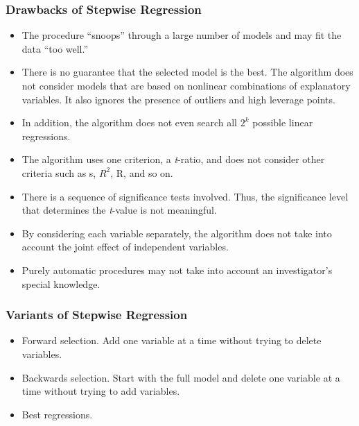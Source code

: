 \begin{frame}%
 \frametitle{Drawbacks of Stepwise Regression}
 \begin{itemize}

\item The procedure ``snoops'' through a large number of models and may
fit the data ``too well.''

\item There is no guarantee that the selected model is the best. The algorithm
does not consider models that are based on nonlinear combinations of
explanatory variables. It also ignores the presence of outliers and
high leverage points.

  \item In addition, the algorithm does not even search all $2^{k}$ possible
linear regressions.

  \item The algorithm uses one criterion, a \textit{t}-ratio, and does not
consider other criteria such as s, $R^{2}$, R, and so on.

  \item There is a sequence of significance tests involved. Thus, the
significance level that determines the \textit{t}-value is not
meaningful.

  \item By considering each variable separately, the algorithm does not take into
account the joint effect of independent variables.

  \item Purely automatic procedures may not take into account an investigator's
special knowledge.

    \end{itemize}
\end{frame}

\begin{frame}%
 \frametitle{Variants of Stepwise Regression }
 \begin{itemize}
\item Forward selection. Add one variable at a time without trying
to delete variables.

\item Backwards selection. Start with the full model and delete one variable at
a time without trying to add variables.
\item Best regressions.
    \end{itemize}
\end{frame}

